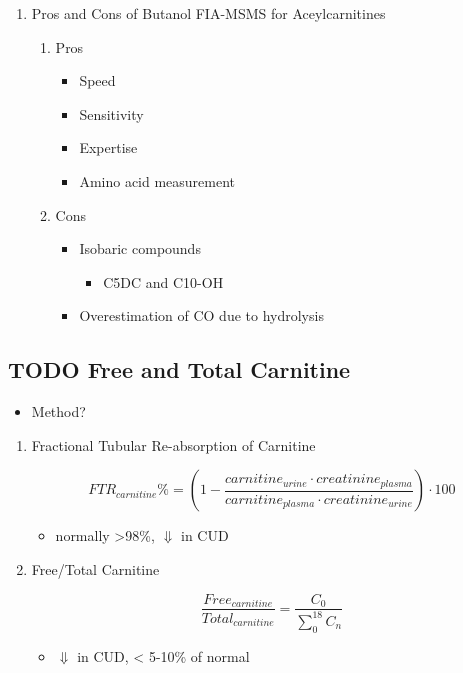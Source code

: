 \documentclass{scrartcl}
\begin{document}
\begin{enumerate}
\item Pros and Cons of Butanol  FIA-MSMS for Aceylcarnitines
\label{sec:org07603c8}
\begin{enumerate}
\item Pros
\label{sec:orgff0bedd}
\begin{itemize}
\item Speed
\item Sensitivity
\item Expertise
\item Amino acid measurement
\end{itemize}
\item Cons
\label{sec:org020e9a6}
\begin{itemize}
\item Isobaric compounds
\begin{itemize}
\item C5DC and C10-OH
\end{itemize}
\item Overestimation of CO due to hydrolysis
\end{itemize}
\end{enumerate}
\end{enumerate}


\subsection{{\bfseries\sffamily TODO} Free and Total Carnitine}
\label{sec:orgefc0742}
\begin{itemize}
\item Method?
\end{itemize}
\begin{enumerate}
\item Fractional Tubular Re-absorption of Carnitine
\label{sec:org329e524}

\begin{LaTeX}
\begin{equation*}
FTR_{carnitine}\% = \left( 1 -  \frac{carnitine_{urine} \cdot creatinine_{plasma}}{carnitine_{plasma} \cdot creatinine_{urine}}\right) \cdot 100
\end{equation*}
\end{LaTeX}

\begin{itemize}
\item normally >98\%, \(\Downarrow\) in CUD
\end{itemize}

\item Free/Total Carnitine
\label{sec:org0eec331}

\[
\frac{Free_{carnitine}}{Total_{carnitine}} = \frac{C_0}{\sum_{0}^{18} C_n}
\]

\begin{itemize}
\item \(\Downarrow\) in CUD, < 5-10\% of normal
\end{itemize}
\end{enumerate}
\end{document}
